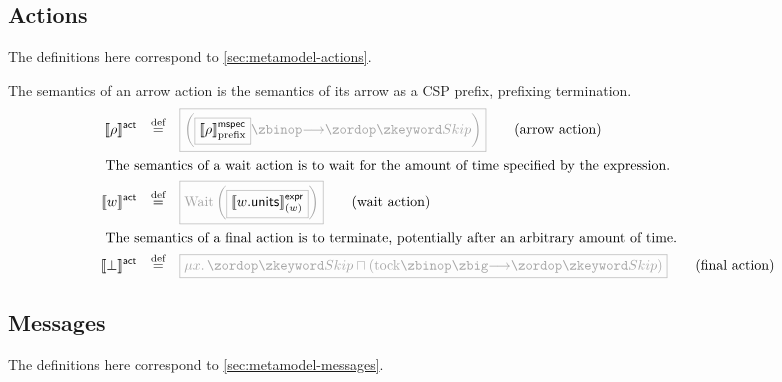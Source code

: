 \subsection{Actions}\label{ssec:semantics-tockcsp-actions}

The definitions here correspond to \cref{sec:metamodel-actions}.

\begin{definition}[\msequenceaction]

\newcommand{\wait}[1]{\text{Wait}\left(#1\right)}
  
The semantics of an arrow action is the semantics of its arrow as a CSP prefix,
prefixing termination.
%
\begin{align*}
  \actsema{\anarrow}
  \quad\defeq\quad
  &
    \tlang{
    \left(
    \olang{\pmspecsema{\anarrow}}
    \then
    \Skip
    \right)
    }
    \tag{arrow action}
  \\
  \intertext{
  The semantics of a wait action is to wait for the amount of time specified by the expression.}
  \actsema{\await}
  \quad\defeq\quad
  &
    \tlang{
    \wait{\olang{\exprsema{\field{\await}{units}}{\await}}}
    }
    \tag{wait action}
  \\
  \intertext{
  The semantics of a final action is to terminate, potentially after an arbitrary amount of time.}
  \actsema{\bot}
  \quad\defeq\quad
  &
    \tlang{
    \mu x \ldotp
    \Skip
    \sqcap
    \left(\tock \circthen \Skip\right)
    }
    \tag{final action}
\end{align*}

\end{definition}

\subsection{Messages}\label{ssec:semantics-tockcsp-messages}

The definitions here correspond to \cref{sec:metamodel-messages}.

